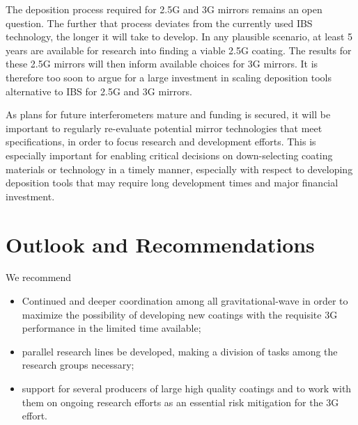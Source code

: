 The deposition process required for \ac{2.5G} and \ac{3G} mirrors remains an open question. The further that process deviates from the currently used \ac{IBS} technology, the longer it will take to develop. In any plausible scenario, at least 5 years are available for research into finding a viable \ac{2.5G} coating. The results for these \ac{2.5G} mirrors will then inform available choices for \ac{3G} mirrors. It is therefore too soon to argue for a large investment in scaling deposition tools alternative to \ac{IBS} for \ac{2.5G} and \ac{3G} mirrors.

As plans for future interferometers mature and funding is secured, it will be important to regularly re-evaluate potential mirror technologies that meet specifications, in order to focus research and development efforts. This is especially important for enabling critical decisions on down-selecting coating materials or technology in a timely manner, especially with respect to developing deposition tools that may require long development times and major financial investment.



\section{Outlook and Recommendations}
\label{coatings_Recomm}
We recommend
\begin{itemize}
\item Continued and deeper coordination among all gravitational-wave in order to maximize the possibility of developing new coatings with the requisite \ac{3G} performance in the limited time available;
\item  parallel research lines be developed, making a division of tasks among the research groups necessary;
\item support for several producers of large high quality coatings and to work with them on ongoing research efforts as an essential risk mitigation for the \ac{3G} effort.
\end{itemize}



